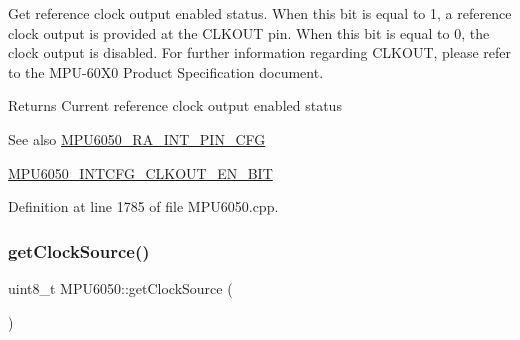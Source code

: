 Get reference clock output enabled status. When this bit is equal to 1, a reference clock output is provided at the C\+L\+K\+O\+UT pin. When this bit is equal to 0, the clock output is disabled. For further information regarding C\+L\+K\+O\+UT, please refer to the M\+P\+U-\/60\+X0 Product Specification document. \begin{DoxyReturn}{Returns}
Current reference clock output enabled status 
\end{DoxyReturn}
\begin{DoxySeeAlso}{See also}
\mbox{\hyperlink{MPU6050_8h_a82344e1daef2bac2e0d938319528be6c}{M\+P\+U6050\+\_\+\+R\+A\+\_\+\+I\+N\+T\+\_\+\+P\+I\+N\+\_\+\+C\+FG}} 

\mbox{\hyperlink{MPU6050_8h_af6f983ee1d32777d725f259c7806f15a}{M\+P\+U6050\+\_\+\+I\+N\+T\+C\+F\+G\+\_\+\+C\+L\+K\+O\+U\+T\+\_\+\+E\+N\+\_\+\+B\+IT}} 
\end{DoxySeeAlso}


Definition at line 1785 of file M\+P\+U6050.\+cpp.


\begin{DoxyCode}{0}

\end{DoxyCode}
\mbox{\label{classMPU6050_a8ed670258a805807b5102cdc5d0996a8}} 
\subsubsection{\texorpdfstring{getClockSource()}{getClockSource()}}
{\footnotesize\ttfamily uint8\+\_\+t M\+P\+U6050\+::get\+Clock\+Source (\begin{DoxyParamCaption}{ }\end{DoxyParamCaption})}

